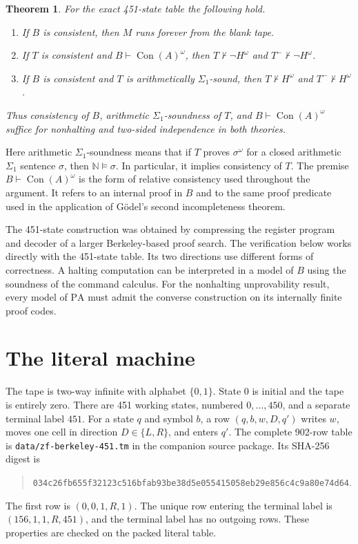 \documentclass[11pt,letterpaper]{article}
\newtheorem{theorem}{Theorem}[section]
\theoremstyle{definition}
\newcommand{\PA}{\mathrm{PA}}
\newcommand{\Con}{\operatorname{Con}}
\newcommand{\N}{\mathbb{N}}
\newcommand{\setread}[1]{#1^{\omega}}
\newcommand{\file}[1]{\texttt{\nolinkurl{#1}}}
\begin{document}
\begin{theorem}\label{thm:main}
For the exact 451-state table the following hold.
\begin{enumerate}
\item If $B$ is consistent, then $M$ runs forever from the blank tape.
\item If $T$ is consistent and $B\vdash\setread{\Con(A)}$, then
      $T\nvdash\neg\setread{H}$ and $T^-\nvdash\neg\setread{H}$.
\item If $B$ is consistent and $T$ is arithmetically $\Sigma_1$-sound,
      then $T\nvdash\setread{H}$ and $T^-\nvdash\setread{H}$.
\end{enumerate}
Thus consistency of $B$, arithmetic $\Sigma_1$-soundness of $T$,
and $B\vdash\setread{\Con(A)}$ suffice for nonhalting and two-sided
independence in both theories.
\end{theorem}

Here arithmetic $\Sigma_1$-soundness means that if $T$ proves
$\setread{\sigma}$ for a closed arithmetic $\Sigma_1$ sentence
$\sigma$, then $\N\models\sigma$. In particular, it implies consistency
of $T$. The premise $B\vdash\setread{\Con(A)}$ is the form of relative
consistency used throughout the argument. It refers to an internal
proof in $B$ and to the same proof predicate used in the application
of G\"odel's second incompleteness theorem.

The 451-state construction was obtained by compressing the register
program and decoder of a larger Berkeley-based proof search. The
verification below works directly with the 451-state table. Its two
directions use different forms of correctness. A halting computation
can be interpreted in a model of $B$ using the soundness of the
command calculus. For the nonhalting unprovability result, every
model of $\PA$ must admit the converse construction on its
internally finite proof codes.

\section{The literal machine}\label{sec:literal}

The tape is two-way infinite with alphabet $\{0,1\}$. State $0$ is
initial and the tape is entirely zero. There are 451 working states,
numbered $0,\ldots,450$, and a separate terminal label $451$.
For a state $q$ and symbol $b$, a row $(q,b,w,D,q')$ writes $w$,
moves one cell in direction $D\in\{L,R\}$, and enters $q'$.
The complete 902-row table is \file{data/zf-berkeley-451.tm} in the
companion source package. Its SHA-256 digest is
\begin{quote}\small
\nolinkurl{034c26fb655f32123c516bfab93be38d5e055415058eb29e856c4c9a80e74d64}.
\end{quote}
The first row is $(0,0,1,R,1)$. The unique row entering the terminal
label is $(156,1,1,R,451)$, and the terminal label has no outgoing
rows. These properties are checked on the packed literal table.
\end{document}
